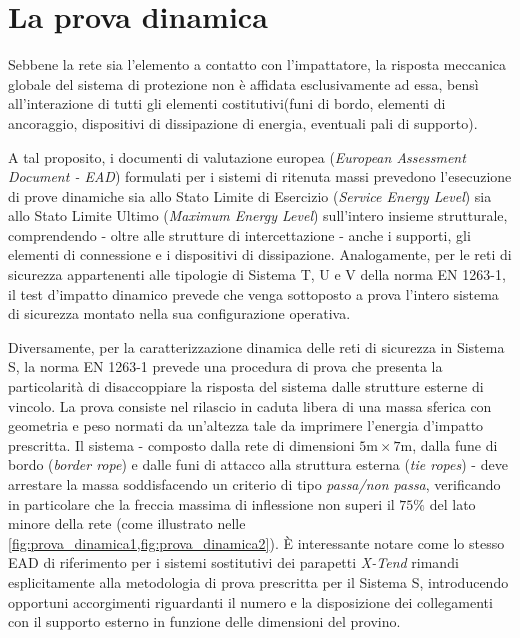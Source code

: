 \section{La prova dinamica}\label{sec:prova_dinamica}
Sebbene la rete sia l'elemento a contatto con l'impattatore, la risposta meccanica globale del sistema di protezione non è affidata esclusivamente ad essa, bensì all'interazione di tutti gli elementi costitutivi(funi di bordo, elementi di ancoraggio, dispositivi di dissipazione di energia, eventuali pali di supporto).

A tal proposito, i documenti di valutazione europea (\textit{European Assessment Document - EAD}) formulati per i sistemi di ritenuta massi prevedono l'esecuzione di prove dinamiche sia allo Stato Limite di Esercizio (\textit{Service Energy Level}) sia allo Stato Limite Ultimo (\textit{Maximum Energy Level}) sull'intero insieme strutturale, comprendendo - oltre alle strutture di intercettazione - anche i supporti, gli elementi di connessione e i dispositivi di dissipazione. Analogamente, per le reti di sicurezza appartenenti alle tipologie di Sistema T, U e V della norma EN 1263-1, il test d'impatto dinamico prevede che venga sottoposto a prova l'intero sistema di sicurezza montato nella sua configurazione operativa. 

Diversamente, per la caratterizzazione dinamica delle reti di sicurezza in Sistema S, la norma EN 1263-1 prevede una procedura di prova che presenta la particolarità di disaccoppiare la risposta del sistema dalle strutture esterne di vincolo. La prova consiste nel rilascio in caduta libera di una massa sferica con geometria e peso normati da un'altezza tale da imprimere l'energia d'impatto prescritta. Il sistema - composto dalla rete di dimensioni $ 5 \text{m} \times 7 \text{m}$, dalla fune di bordo (\textit{border rope}) e dalle funi di attacco alla struttura esterna (\textit{tie ropes}) - deve arrestare la massa soddisfacendo un criterio di tipo \textit{passa/non passa}, verificando in particolare che la freccia massima di inflessione non superi il $75\%$ del lato minore della rete (come illustrato nelle \cref{fig:prova_dinamica1,fig:prova_dinamica2}). \`E interessante notare come lo stesso EAD di riferimento per i sistemi sostitutivi dei parapetti \textit{X-Tend} rimandi esplicitamente alla metodologia di prova prescritta per il Sistema S, introducendo opportuni accorgimenti riguardanti il numero e la disposizione dei collegamenti con il supporto esterno in funzione delle dimensioni del provino.


